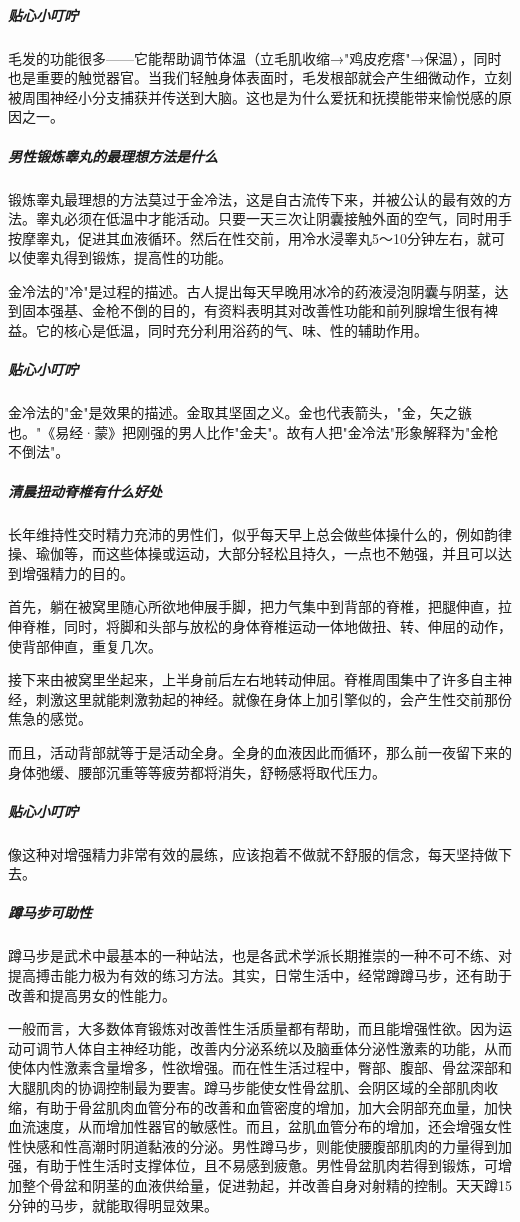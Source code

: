 \begin{enumerate}
\subparagraph{贴心小叮咛}

毛发的功能很多——它能帮助调节体温（立毛肌收缩→"鸡皮疙瘩"→保温），同时也是重要的触觉器官。当我们轻触身体表面时，毛发根部就会产生细微动作，立刻被周围神经小分支捕获并传送到大脑。这也是为什么爱抚和抚摸能带来愉悦感的原因之一。

\subparagraph{男性锻炼睾丸的最理想方法是什么}

锻炼睾丸最理想的方法莫过于金冷法，这是自古流传下来，并被公认的最有效的方法。睾丸必须在低温中才能活动。只要一天三次让阴囊接触外面的空气，同时用手按摩睾丸，促进其血液循环。然后在性交前，用冷水浸睾丸5～10分钟左右，就可以使睾丸得到锻炼，提高性的功能。

金冷法的"冷"是过程的描述。古人提出每天早晚用冰冷的药液浸泡阴囊与阴茎，达到固本强基、金枪不倒的目的，有资料表明其对改善性功能和前列腺增生很有裨益。它的核心是低温，同时充分利用浴药的气、味、性的辅助作用。

\subparagraph{贴心小叮咛}

金冷法的"金"是效果的描述。金取其坚固之义。金也代表箭头，"金，矢之镞也。"《易经·蒙》把刚强的男人比作"金夫"。故有人把"金冷法"形象解释为"金枪不倒法"。

\subparagraph{清晨扭动脊椎有什么好处}

长年维持性交时精力充沛的男性们，似乎每天早上总会做些体操什么的，例如韵律操、瑜伽等，而这些体操或运动，大部分轻松且持久，一点也不勉强，并且可以达到增强精力的目的。

首先，躺在被窝里随心所欲地伸展手脚，把力气集中到背部的脊椎，把腿伸直，拉伸脊椎，同时，将脚和头部与放松的身体脊椎运动一体地做扭、转、伸屈的动作，使背部伸直，重复几次。

接下来由被窝里坐起来，上半身前后左右地转动伸屈。脊椎周围集中了许多自主神经，刺激这里就能刺激勃起的神经。就像在身体上加引擎似的，会产生性交前那份焦急的感觉。

而且，活动背部就等于是活动全身。全身的血液因此而循环，那么前一夜留下来的身体弛缓、腰部沉重等等疲劳都将消失，舒畅感将取代压力。

\subparagraph{贴心小叮咛}

像这种对增强精力非常有效的晨练，应该抱着不做就不舒服的信念，每天坚持做下去。

\subparagraph{蹲马步可助性}

蹲马步是武术中最基本的一种站法，也是各武术学派长期推崇的一种不可不练、对提高搏击能力极为有效的练习方法。其实，日常生活中，经常蹲蹲马步，还有助于改善和提高男女的性能力。

一般而言，大多数体育锻炼对改善性生活质量都有帮助，而且能增强性欲。因为运动可调节人体自主神经功能，改善内分泌系统以及脑垂体分泌性激素的功能，从而使体内性激素含量增多，性欲增强。而在性生活过程中，臀部、腹部、骨盆深部和大腿肌肉的协调控制最为要害。蹲马步能使女性骨盆肌、会阴区域的全部肌肉收缩，有助于骨盆肌肉血管分布的改善和血管密度的增加，加大会阴部充血量，加快血流速度，从而增加性器官的敏感性。而且，盆肌血管分布的增加，还会增强女性性快感和性高潮时阴道黏液的分泌。男性蹲马步，则能使腰腹部肌肉的力量得到加强，有助于性生活时支撑体位，且不易感到疲惫。男性骨盆肌肉若得到锻炼，可增加整个骨盆和阴茎的血液供给量，促进勃起，并改善自身对射精的控制。天天蹲15分钟的马步，就能取得明显效果。


\end{enumerate}
